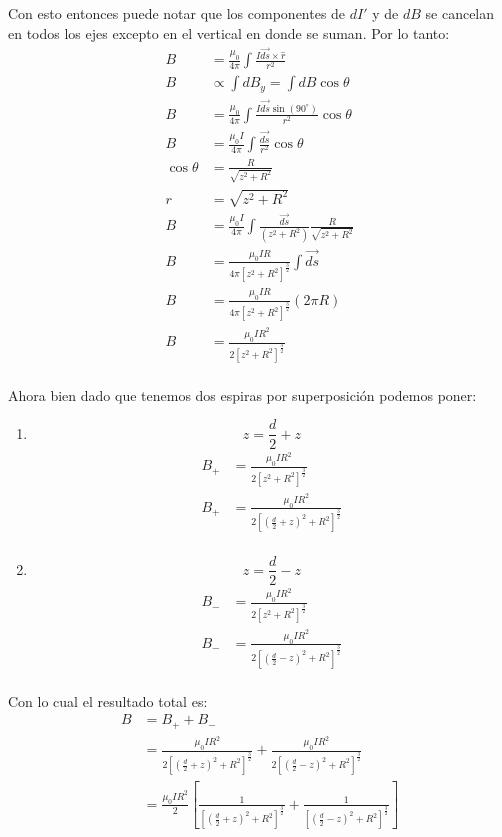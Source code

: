 \documentclass{report}
\begin{document}
Con esto entonces puede notar que los componentes de $d I'$ y de $d B$ se cancelan en todos los ejes excepto en el vertical en donde se suman. Por lo tanto:
\begin{align*}
	B &= \frac{\mu_0}{4\pi} \int \frac{I \vec{d s} \times \hat{r}}{r^2}\\
	B &\propto \int d B_y = \int dB \cos\theta\\
	B &= \frac{\mu_0}{4\pi} \int \frac{I \vec{d s} \sin\left(90^{\circ}\right)}{r^2}\cos\theta\\
	B &= \frac{\mu_0 I}{4\pi} \int \frac{\vec{d s}}{r^2}\cos\theta\\
	\cos\theta &= \frac{R}{\sqrt{z^2 + R^2}}\\
	r &= \sqrt{z^2 + R^2}\\
	B &= \frac{\mu_0 I}{4\pi} \int \frac{\vec{d s}}{\left(z^2 + R^2\right)}\frac{R}{\sqrt{z^2 + R^2}}\\
	B &= \frac{\mu_0 I R}{4\pi \left[ z^2 + R^2\right]^{\frac{3}{2}}} \int \vec{d s}\\
	B &= \frac{\mu_0 I R}{4\pi \left[ z^2 + R^2\right]^{\frac{3}{2}}} \left( 2\pi R\right)\\
	B &= \frac{\mu_0 I R^2}{2\left[ z^2 + R^2\right]^{\frac{3}{2}}}\\
\end{align*}

Ahora bien dado que tenemos dos espiras por superposición podemos poner:

\begin{enumerate}
	\item $$z = \frac{d}{2} + z$$
		\begin{align*}
			B_+ &= \frac{\mu_0 I R^2}{2\left[ z^2 + R^2\right]^{\frac{3}{2}}}\\
			B_+ &= \frac{\mu_0 I R^2}{2\left[ \left(\frac{d}{2} + z\right)^2 + R^2\right]^{\frac{3}{2}}}\\
		\end{align*}
	\item $$z = \frac{d}{2} - z$$
		\begin{align*}
			B_- &= \frac{\mu_0 I R^2}{2\left[ z^2 + R^2\right]^{\frac{3}{2}}}\\
			B_- &= \frac{\mu_0 I R^2}{2\left[ \left(\frac{d}{2} - z\right)^2 + R^2\right]^{\frac{3}{2}}}\\
		\end{align*}
\end{enumerate}

Con lo cual el resultado total es:
\begin{align*}
	B &= B_+ + B_-\\
	& = \frac{\mu_0 I R^2}{2\left[ \left(\frac{d}{2} + z\right)^2 + R^2\right]^{\frac{3}{2}}} + \frac{\mu_0 I R^2}{2\left[ \left(\frac{d}{2} - z\right)^2 + R^2\right]^{\frac{3}{2}}}\\
	& = \frac{\mu_0 I R^2}{2} \left[\frac{1}{\left[ \left(\frac{d}{2} + z\right)^2 + R^2\right]^{\frac{3}{2}}} + \frac{1}{\left[ \left(\frac{d}{2} - z\right)^2 + R^2\right]^{\frac{3}{2}}}\right]\\
\end{align*}
\end{document}
